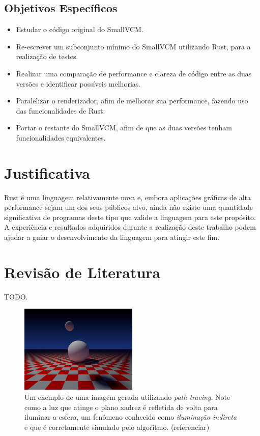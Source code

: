 \documentclass[12pt]{article}
\newcommand{\todo}[1]{\textsf{\color{red}#1}}
\begin{document}
\subsection{Objetivos Específicos}
\begin{itemize}
	\item Estudar o código original do SmallVCM.
	\item Re-escrever um subconjunto mínimo do SmallVCM utilizando Rust, para a realização de
		testes.
	\item Realizar uma comparação de performance e clareza de código entre as duas versões e
		identificar possíveis melhorias.
	\item Paralelizar o renderizador, afim de melhorar sua performance, fazendo uso das
		funcionalidades de Rust.
	\item Portar o restante do SmallVCM, afim de que as duas versões tenham funcionalidades
		equivalentes.
\end{itemize}

\section{Justificativa}

Rust é uma linguagem relativamente nova e, embora aplicações gráficas de alta performance sejam um
dos seus públicos alvo, ainda não existe uma quantidade significativa de programas deste tipo que
valide a linguagem para este propósito. A experiência e resultados adquiridos durante a realização
deste trabalho podem ajudar a guiar o desenvolvimento da linguagem para atingir este fim.

\section{Revisão de Literatura}

\todo{TODO.}

\begin{figure}
	\centering
	\includegraphics[width=0.5\textwidth]{exemplo_imagem}
	\caption{
		Um exemplo de uma imagem gerada utilizando \emph{path tracing}. Note como a luz que atinge o
		plano xadrez é refletida de volta para iluminar a esfera, um fenômeno conhecido como
		\emph{iluminação indireta} e que é corretamente simulado pelo algoritmo.
		\todo{(referenciar)}
	}
\end{figure}
\end{document}

